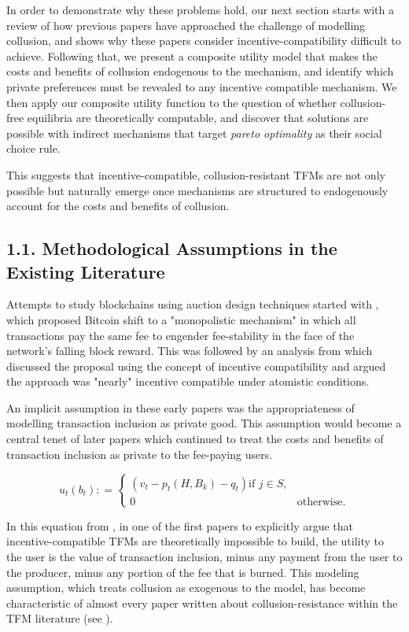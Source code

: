 \documentclass[oneside]{article}   	%
\begin{document}
In order to demonstrate why these problems hold, our next section starts with a review of how previous papers have approached the challenge of modelling collusion, and shows why these papers consider incentive-compatibility difficult to achieve. Following that, we present a composite utility model that makes the costs and benefits of collusion endogenous to the mechanism, and identify which private preferences must be revealed to any incentive compatible mechanism. We then apply our composite utility function to the question of whether collusion-free equilibria are theoretically computable, and discover that solutions are possible with indirect mechanisms that target \textit{pareto optimality} as their social choice rule.

This suggests that incentive-compatible, collusion-resistant TFMs are not only possible but naturally emerge once mechanisms are structured to endogenously account for the costs and benefits of collusion.


\subsection*{1.1. Methodological Assumptions in the Existing Literature}

Attempts to study blockchains using auction design techniques started with \cite{Lavi2017RedesigningBitcoin}, which proposed Bitcoin shift to a "monopolistic mechanism" in which all transactions pay the same fee to engender fee-stability in the face of the network's falling block reward. This was followed by an analysis from \cite{Yao2018IncentiveBitcoin} which discussed the proposal using the concept of incentive compatibility and argued the approach was "nearly" incentive compatible under atomistic conditions.

An implicit assumption in these early papers was the appropriateness of modelling transaction inclusion as private good. This assumption would become a central tenet of later papers which continued to treat the costs and benefits of transaction inclusion as private to the fee-paying users.

\[
u_t\left(b_t\right) : =
\begin{cases}
\left(
        v_t - p_t\left(H,B_k\right) - q_t
\right) \text{if } j \in S, \\ 0 & \text{otherwise.}
\end{cases}
\]

In this equation from \cite{roughgarden2024}, in one of the first papers to explicitly argue that incentive-compatible TFMs are theoretically impossible to build, the utility to the user is the value of transaction inclusion, minus any payment from the user to the producer, minus any portion of the fee that is burned. This modeling assumption, which treats collusion as exogenous to the model, has become characteristic of almost every paper written about collusion-resistance within the TFM literature (see \cite{chen2022bayesian, ferreira2021dynamic, wu2023maximizing, damle2024designing, gafni2024barriers, bahrani2023transaction, bahrani2024transaction, chung2024collusion, chung2023foundations}).
\end{document}
